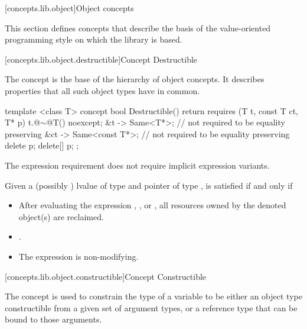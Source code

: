 \begin{addedblock}
[concepts.lib.object]{Object concepts}

\pnum
This section defines concepts that describe the basis of the
value-oriented programming style on which the library is based.

[concepts.lib.object.destructible]{Concept Destructible}

\pnum
The  concept is the base of the hierarchy of object concepts.
It describes properties that all such object types have in common.

%
\begin{itemdecl}
template <class T>
concept bool Destructible() {
  return requires (T t, const T ct, T* p) {
    { t.@$\sim$@T() } noexcept;
    { &t } -> Same<T*>; // not required to be equality preserving
    { &ct } -> Same<const T*>; // not required to be equality preserving
    delete p;
    delete[] p;
  };
}
\end{itemdecl}

\begin{itemdescr}
\pnum
The expression requirement  does not require implicit expression variants.

\pnum
Given a (possibly ) lvalue  of type  and pointer
 of type ,  is satisfied if and only if

\begin{itemize}
\item After evaluating the expression ,
, or , all resources owned by
the denoted object(s) are reclaimed.
\item {}.
\item The expression  is non-modifying.
\end{itemize}
\end{itemdescr}

[concepts.lib.object.constructible]{Concept Constructible}

\pnum
The  concept is used to constrain the type of a
variable to be either an object type constructible from a given set of argument
types, or a reference type that can be bound to those arguments.


\end{addedblock}
